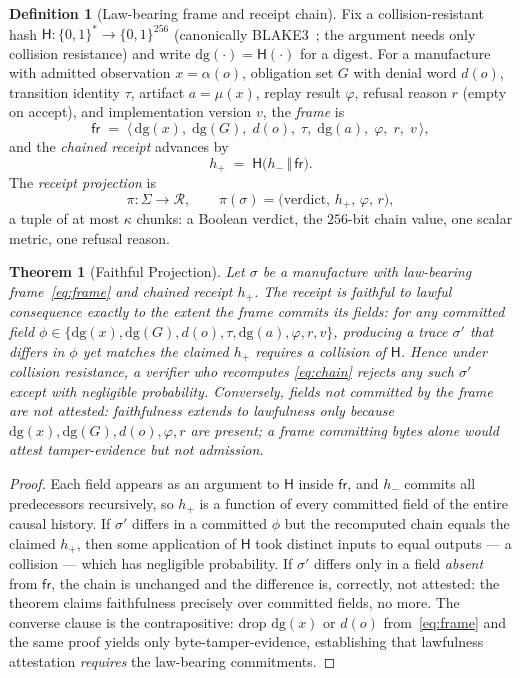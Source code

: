 \documentclass[11pt,oneside]{book}
\theoremstyle{definition}
\newtheorem{definition}{Definition}[chapter]
\theoremstyle{plain}
\newtheorem{theorem}{Theorem}[chapter]
\theoremstyle{remark}
\newcommand{\Recs}{\mathcal{R}}                %
\newcommand{\Proj}{\pi}                        %
\newcommand{\muop}{\mu}                        %
\newcommand{\adm}{\alpha}                      %
\newcommand{\chainH}{\mathsf{H}}               %
\newcommand{\CL}{\kappa}                       %
\newcommand{\Fitness}{\varphi}
\newcommand{\dg}{\mathrm{dg}}                  %
\begin{document}
\begin{definition}[Law-bearing frame and receipt chain]\label{def:receipt}
Fix a collision-resistant hash $\chainH:\{0,1\}^*\to\{0,1\}^{256}$
(canonically BLAKE3~\cite{oconnor2021blake3}; the argument needs only collision resistance)
and write $\dg(\cdot)=\chainH(\cdot)$ for a digest. For a manufacture with admitted observation $x=\adm(o)$,
obligation set $G$ with denial word $d(o)$, transition identity $\tau$, artifact
$a=\muop(x)$, replay result $\Fitness$, refusal reason $r$ (empty on accept), and
implementation version $v$, the \emph{frame} is
\begin{equation}\label{eq:frame}
\mathsf{fr} \;=\; \bigl\langle\, \dg(x),\; \dg(G),\; d(o),\; \tau,\; \dg(a),\;
\Fitness,\; r,\; v \,\bigr\rangle,
\end{equation}
and the \emph{chained receipt} advances by
\begin{equation}\label{eq:chain}
h_{+} \;=\; \chainH\bigl(h_{-}\,\Vert\,\mathsf{fr}\bigr).
\end{equation}
The \emph{receipt projection} is
\[
\Proj:\Sigma\to\Recs,\qquad
\Proj(\sigma)=\bigl(\text{verdict},\,h_{+},\,\Fitness,\,r\bigr),
\]
a tuple of at most $\CL$ chunks: a Boolean verdict, the $256$-bit chain value, one scalar
metric, one refusal reason.
\end{definition}

\begin{theorem}[Faithful Projection]\label{thm:faithful}
Let $\sigma$ be a manufacture with law-bearing frame~\eqref{eq:frame} and chained receipt
$h_+$. The receipt is \emph{faithful to lawful consequence} exactly to the extent the frame
commits its fields: for any committed field $\phi\in\{\dg(x),\dg(G),d(o),\tau,\dg(a),\Fitness,r,v\}$,
producing a trace $\sigma'$ that differs in $\phi$ yet matches the claimed $h_+$ requires a
collision of $\chainH$. Hence under collision resistance, a verifier who recomputes
\eqref{eq:chain} rejects any such $\sigma'$ except with negligible probability. Conversely,
\emph{fields not committed by the frame are not attested}: faithfulness extends to lawfulness
only because $\dg(x),\dg(G),d(o),\Fitness,r$ are present; a frame committing bytes alone would
attest tamper-evidence but not admission.
\end{theorem}

\begin{proof}
Each field appears as an argument to $\chainH$ inside $\mathsf{fr}$, and $h_-$ commits all
predecessors recursively, so $h_+$ is a function of every committed field of the entire causal
history. If $\sigma'$ differs in a committed $\phi$ but the recomputed chain equals the claimed
$h_+$, then some application of $\chainH$ took distinct inputs to equal outputs --- a collision
--- which has negligible probability. If $\sigma'$ differs only in a field \emph{absent} from
$\mathsf{fr}$, the chain is unchanged and the difference is, correctly, not attested: the
theorem claims faithfulness precisely over committed fields, no more. The converse clause is
the contrapositive: drop $\dg(x)$ or $d(o)$ from~\eqref{eq:frame} and the same proof yields
only byte-tamper-evidence, establishing that lawfulness attestation \emph{requires} the
law-bearing commitments. \end{proof}
\end{document}
